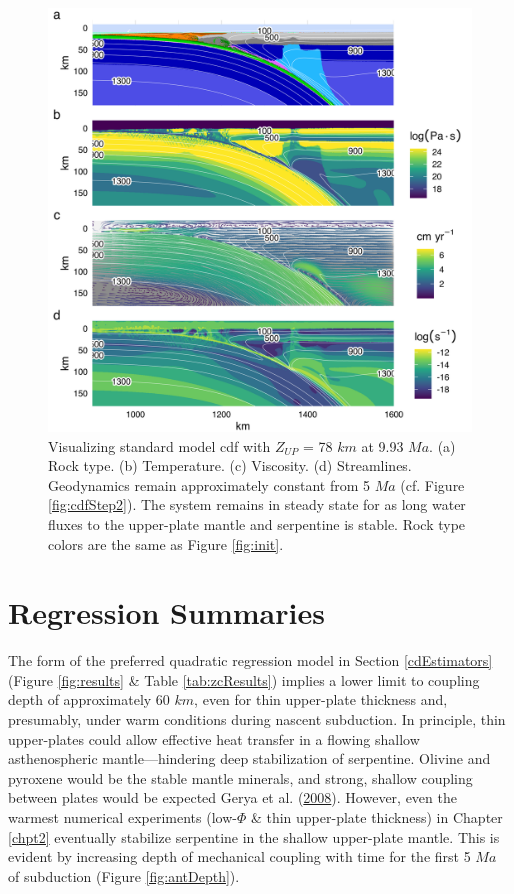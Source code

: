 \begin{figure}[htbp]

{\centering \includegraphics[width=1\linewidth,]{assets/figs/chpt2/figA4} 

}

\caption[Results for model cdf with $Z_{UP}$ = 78 $km$ at 9.93 $Ma$]{Visualizing standard model cdf with $Z_{UP}$ = 78 $km$ at 9.93 $Ma$. (a) Rock type. (b) Temperature. (c) Viscosity. (d) Streamlines. Geodynamics remain approximately constant from 5 $Ma$ (cf. Figure \ref{fig:cdfStep2}). The system remains in steady state for as long water fluxes to the upper-plate mantle and serpentine is stable. Rock type colors are the same as Figure \ref{fig:init}.}\label{fig:cdfStep3}
\end{figure}

\clearpage

\hypertarget{regSummary}{%
\section{Regression Summaries}\label{regSummary}}

The form of the preferred quadratic regression model in Section \ref{cdEstimators} (Figure \ref{fig:results} \& Table \ref{tab:zcResults}) implies a lower limit to coupling depth of approximately 60 \(km\), even for thin upper-plate thickness and, presumably, under warm conditions during nascent subduction. In principle, thin upper-plates could allow effective heat transfer in a flowing shallow asthenospheric mantle---hindering deep stabilization of serpentine. Olivine and pyroxene would be the stable mantle minerals, and strong, shallow coupling between plates would be expected Gerya et al. (\protect\hyperlink{ref-gerya2008}{2008}). However, even the warmest numerical experiments (low-\(\Phi\) \& thin upper-plate thickness) in Chapter \ref{chpt2} eventually stabilize serpentine in the shallow upper-plate mantle. This is evident by increasing depth of mechanical coupling with time for the first 5 \(Ma\) of subduction (Figure \ref{fig:antDepth}).

